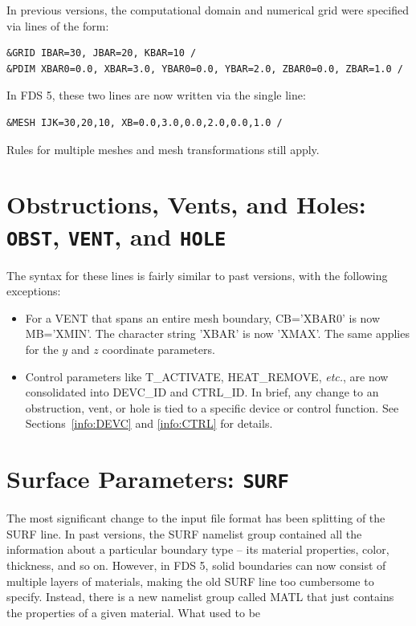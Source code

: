 \documentclass[11pt]{book}
\begin{document}
In previous versions, the computational domain and numerical grid were specified via lines of the form:

\footnotesize
\begin{verbatim}
&GRID IBAR=30, JBAR=20, KBAR=10 /
&PDIM XBAR0=0.0, XBAR=3.0, YBAR0=0.0, YBAR=2.0, ZBAR0=0.0, ZBAR=1.0 /
\end{verbatim} \normalsize

\noindent
In FDS 5, these two lines are now written via the single line:

\footnotesize
\begin{verbatim}
&MESH IJK=30,20,10, XB=0.0,3.0,0.0,2.0,0.0,1.0 /
\end{verbatim} \normalsize

\noindent
Rules for multiple meshes and mesh transformations still apply.

\section{Obstructions, Vents, and Holes: \texorpdfstring{{\tt OBST}}{OBST}, \texorpdfstring{{\tt VENT}}{VENT}, and \texorpdfstring{{\tt HOLE}}{HOLE}}

The syntax for these lines is fairly similar to past versions, with the following exceptions:
\begin{itemize}
\item For a {\ct VENT} that spans an entire mesh boundary, {\ct CB='XBAR0'} is now {\ct MB='XMIN'}. The character string
{\ct 'XBAR'} is now {\ct 'XMAX'}. The same applies for the $y$ and $z$ coordinate parameters.
\item Control parameters like {\ct T\_ACTIVATE}, {\ct HEAT\_REMOVE}, {\em etc.}, are now consolidated into {\ct DEVC\_ID} and
{\ct CTRL\_ID}. In brief,
any change to an obstruction, vent, or hole is tied to a specific device or control function. See Sections~\ref{info:DEVC} and
\ref{info:CTRL} for details.
\end{itemize}


\section{Surface Parameters: \texorpdfstring{{\tt SURF}}{SURF}}

The most significant change to the input file format has been splitting of the {\ct SURF} line. In past versions, the {\ct SURF}
namelist group contained all the information about a particular boundary type -- its material properties, color, thickness, and so on.
However, in FDS 5, solid boundaries can now consist of multiple layers of materials, making the old {\ct SURF} line too cumbersome to
specify. Instead, there is a new namelist group called {\ct MATL} that just contains the properties of a given material. What used to
be
\end{document}

